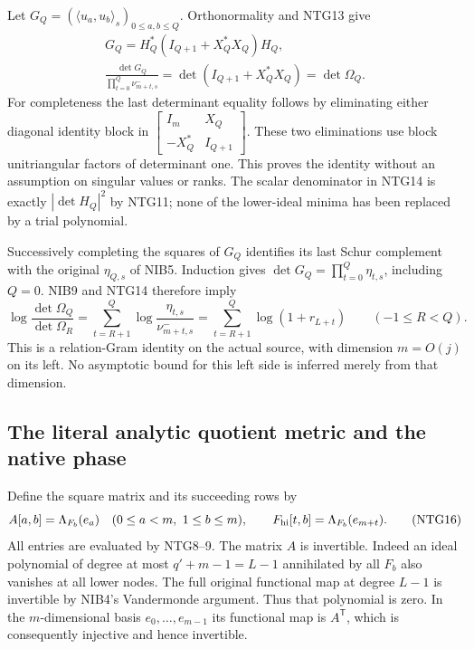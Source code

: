 Let $G_Q=(\langle u_a,u_b\rangle_s)_{0\le a,b\le Q}$.
Orthonormality and NTG13 give
\[
\begin{gathered}
 G_Q=H_Q^*(I_{Q+1}+X_Q^*X_Q)H_Q,\\
 \frac{\det G_Q}{\prod_{t=0}^{Q}\nu_{m+t,s}^-}
       =\det(I_{Q+1}+X_Q^*X_Q)=\det\Omega_Q .
\end{gathered}                                                    \tag{NTG14}
\]
For completeness the last determinant equality follows by
eliminating either diagonal identity block in
$\left[\begin{smallmatrix}I_m&X_Q\\-X_Q^*&I_{Q+1}
\end{smallmatrix}\right]$. These two eliminations use block
unitriangular factors of determinant one. This proves the
identity without an assumption on singular values or ranks.
The scalar denominator in NTG14 is exactly
$|\det H_Q|^2$ by NTG11; none of the lower-ideal minima
has been replaced by a trial polynomial.

Successively completing the squares of $G_Q$ identifies its
last Schur complement with the original $\eta_{Q,s}$ of NIB5.
Induction gives $\det G_Q=\prod_{t=0}^Q\eta_{t,s}$, including
$Q=0$. NIB9 and NTG14 therefore imply
\[
 \log\frac{\det\Omega_Q}{\det\Omega_R}
   =\sum_{t=R+1}^{Q}\log\frac{\eta_{t,s}}{\nu_{m+t,s}^-}
   =\sum_{t=R+1}^{Q}\log(1+r_{L+t})
        \qquad(-1\le R<Q).
                                                               \tag{NTG15}
\]
This is a relation-Gram identity on the actual source, with
dimension $m=O(j)$ on its left. No asymptotic bound for this
left side is inferred merely from that dimension.

\subsection{The literal analytic quotient metric and the native phase}
Define the square matrix and its succeeding rows by
\[
 A[a,b]=\Lambda_{F_b}(e_a)\quad(0\le a<m,\ 1\le b\le m),
 \qquad F_{\rm hi}[t,b]=\Lambda_{F_b}(e_{m+t}).
                                                               \tag{NTG16}
\]
All entries are evaluated by NTG8--9. The matrix $A$ is
invertible. Indeed an ideal polynomial of degree at most
$q'+m-1=L-1$ annihilated by all $F_b$ also vanishes at all
lower nodes. The full original functional map at degree
$L-1$ is invertible by NIB4's Vandermonde argument.
Thus that polynomial is zero. In the $m$-dimensional basis
$e_0,\ldots,e_{m-1}$ its functional map is $A^{\mathsf T}$,
which is consequently injective and hence invertible.

